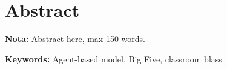 \chapter{Abstract}
{\bf Nota:} Abstract here, max 150 words. 

{\bf Keywords:} Agent-based model, Big Five, classroom
\cite{Asendorpf2003}
blass